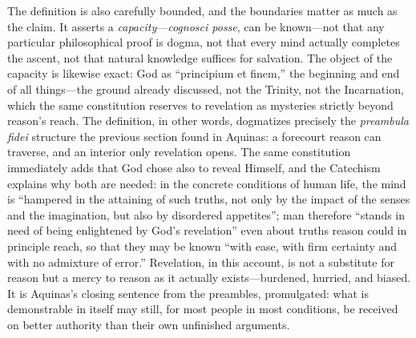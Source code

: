 The definition is also carefully bounded, and the boundaries matter as much as the claim. It asserts a \emph{capacity}---\emph{cognosci posse}, can be known---not that any particular philosophical proof is dogma, not that every mind actually completes the ascent, not that natural knowledge suffices for salvation. The object of the capacity is likewise exact: God as ``principium et finem,'' the beginning and end of all things---the ground already discussed, not the Trinity, not the Incarnation, which the same constitution reserves to revelation as mysteries strictly beyond reason's reach. The definition, in other words, dogmatizes precisely the \emph{preambula fidei} structure the previous section found in Aquinas: a forecourt reason can traverse, and an interior only revelation opens. The same constitution immediately adds that God chose also to reveal Himself, and the Catechism explains why both are needed: in the concrete conditions of human life, the mind is ``hampered in the attaining of such truths, not only by the impact of the senses and the imagination, but also by disordered appetites''; man therefore ``stands in need of being enlightened by God's revelation'' even about truths reason could in principle reach, so that they may be known ``with ease, with firm certainty and with no admixture of error.'' Revelation, in this account, is not a substitute for reason but a mercy to reason as it actually exists---burdened, hurried, and biased. It is Aquinas's closing sentence from the preambles, promulgated: what is demonstrable in itself may still, for most people in most conditions, be received on better authority than their own unfinished arguments.


